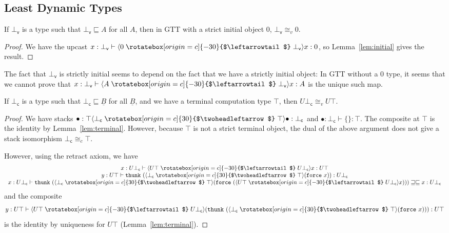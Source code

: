 \documentclass[acmsmall,screen,12pt]{acmart}
\renewcommand{\u}{\underline}
\newcommand{\ltdyn}{\sqsubseteq}
\newcommand{\gtdyn}{\sqsupseteq}
\newcommand{\equidyn}{\mathrel{\gtdyn\ltdyn}}
\newcommand{\uarrow}{\mathrel{\rotatebox[origin=c]{-30}{$\leftarrowtail$}}}
\newcommand{\darrow}{\mathrel{\rotatebox[origin=c]{30}{$\twoheadleftarrow$}}}
\newcommand{\upcast}[2]{\langle{#2}\uarrow{#1}\rangle}
\newcommand{\dncast}[2]{\langle{#1}\darrow{#2}\rangle}
\newcommand{\kw}[1]{\texttt{#1}\,\,}
\newcommand{\thunk}{\kw{thunk}}
\newcommand{\force}{\kw{force}}
\newcommand\leastdynv[0]{\bot_{\mathsf{v}}}
\newcommand\leastdync[0]{\bot_{\mathsf{c}}}
\begin{document}
\begin{longonly}
\subsection{Least Dynamic Types}

\begin{longonly}
\begin{theorem}
  If $\leastdynv$ is a type such that $\leastdynv \ltdyn A$ for all $A$,
  then in GTT with a strict initial object $0$, $\leastdynv \cong_{v}
  0$.
\end{theorem}
\begin{proof}
We have the upcast $x : \leastdynv \vdash \upcast{\leastdynv}{0}{x} :
0$, so Lemma~\ref{lem:initial} gives the result.
\end{proof}
The fact that $\leastdynv$ is strictly initial seems to depend on the
fact that we have a strictly initial object: In GTT without a $0$ type,
it seems that we cannot prove that $x : \leastdynv \vdash
\upcast{\leastdynv}{A}{x} : A$ is the unique such map.  

\begin{theorem}
If $\leastdync$ is a type such that $\leastdync \ltdyn \u B$ for all $\u
B$, and we have a terminal computation type $\top$, then $U \leastdync
\cong_{v} U \top$.
\end{theorem}
\begin{proof}
We have stacks $\bullet : \top \dncast{\leastdync}{\top}{\bullet} :
\leastdync$ and $\bullet : \leastdync \vdash \{\} : \top$.  The
composite at $\top$ is the identity by Lemma~\ref{lem:terminal}.  However,
because $\top$ is not a strict terminal object, the dual of the above
argument does not give a stack isomorphism $\leastdync \cong_c \top$.

However, using the retract axiom, we have
\[
\begin{array}{c}
  x : U \leastdync \vdash \upcast{U \leastdync}{U \top}{x} : U \top\\
  y : U \top \vdash \thunk{(\dncast{\leastdync}{\top}{(\force{x})})} : U \leastdync\\
  x : U \leastdync \vdash \thunk{(\dncast{\leastdync}{\top}{(\force{(\upcast{U \leastdync}{U \top}{x})})})} \equidyn x : U \leastdync
\end{array}
\]
and the composite 
\[
y : U \top \vdash \upcast{U \leastdync}{U \top}{(\thunk{(\dncast{\leastdync}{\top}{(\force{x})})})} : U \top
\]
is the identity by uniqueness for $U \top$ (Lemma~\ref{lem:terminal}).  
\end{proof}


\end{longonly}
\end{longonly}
\end{document}
